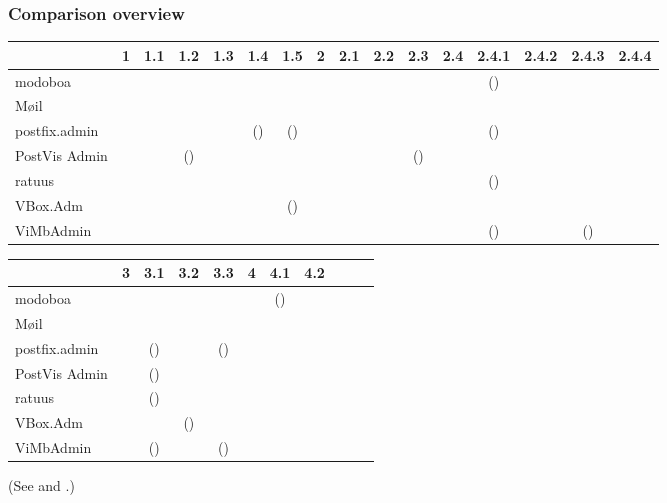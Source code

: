 \documentclass[12pt,a4paper]{scrartcl}
\begin{document}
			\begin{landscape}
				\subsubsection{Comparison overview}
				\label{sec:evaluation:overview}
					\begin{tabular}{l|cccccc|ccccccccc}
						              & 1 & 1.1 & 1.2  & 1.3 & 1.4   & 1.5  & 2 & 2.1 & 2.2 & 2.3  & 2.4 & 2.4.1 & 2.4.2 & 2.4.3 & 2.4.4 \\
						\hline
						modoboa       &   & \y  &  \n  & \y  &  \y   &  \y  &   & \y  & \y  &  \y  &     & (\y)  & \y    &  \y   & \y    \\
						Møil          &   & \y  &  \n  & \y  &  \y   &  \y  &   & \y  & \y  &  \y  &     &  \y   & \n    &  \n   & \n    \\
						postfix.admin &   & \n  &      &     & (\y)  & (\y) &   & \y  & \y  &  \y  &     & (\y)  & \y    &  \n   & \n    \\
						PostVis Admin &   & \n  & (\y) & \n  &  \n   &  \n  &   & \y  & \n  & (\y) &     &  \n   & \n    &  \n   & \y    \\
						ratuus        &   & \n  &  \y  & \y  &  \n   &  \n  &   & \y  & \y  &  \y  &     & (\y)  & \n    &  \n   & \n    \\
						VBox.Adm      &   & \y  &  \n  & \y  &  \n   & (\y) &   & \y  & \y  &  \y  &     &  \n   & \y    &  \n   & \y    \\
						ViMbAdmin     &   & \y  &  \n  & \n  &  \n   &  \y  &   & \y  & \y  &  \y  &     & (\y)  & \n    & (\n)  & \n    \\
						\hline
					\end{tabular}
					\s

					\noindent
					\begin{tabular}{l|cccc|ccc|ccc}
						              & 3 & 3.1  & 3.2  & 3.3  & 4 & 4.1  & 4.2 \\
						\hline
						modoboa       &   &  \y  &  \y  &  \y  &   & (\y) & \y  \\
						Møil          &   &  \y  &  \y  &  \y  &   &  \y  & \y  \\
						postfix.admin &   & (\y) &  \n  & (\y) &   &  \n  & \y  \\
						PostVis Admin &   & (\y) &  \n  &  \n  &   &  \n  & \n  \\
						ratuus        &   & (\y) &  \n  &  \y  &   &  \n  & \n  \\
						VBox.Adm      &   &  \y  & (\y) &  \y  &   &  \n  & \y  \\
						ViMbAdmin     &   & (\y) &  \n  & (\n) &   &  \n  & \n  \\
						\hline
					\end{tabular}
					\s

					(See  and
					.)
			\end{landscape}
\end{document}
